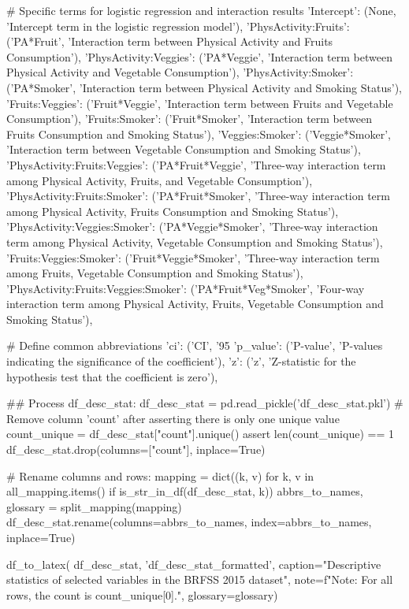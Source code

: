 \documentclass[11pt]{article}
\begin{document}
\begin{python}
{    # Specific terms for logistic regression and interaction results
    'Intercept': (None, 'Intercept term in the logistic regression model'),
    'PhysActivity:Fruits': ('PA*Fruit', 'Interaction term between Physical Activity and Fruits Consumption'),
    'PhysActivity:Veggies': ('PA*Veggie', 'Interaction term between Physical Activity and Vegetable Consumption'),
    'PhysActivity:Smoker': ('PA*Smoker', 'Interaction term between Physical Activity and Smoking Status'),
    'Fruits:Veggies': ('Fruit*Veggie', 'Interaction term between Fruits and Vegetable Consumption'),
    'Fruits:Smoker': ('Fruit*Smoker', 'Interaction term between Fruits Consumption and Smoking Status'),
    'Veggies:Smoker': ('Veggie*Smoker', 'Interaction term between Vegetable Consumption and Smoking Status'),
    'PhysActivity:Fruits:Veggies': ('PA*Fruit*Veggie', 'Three-way interaction term among Physical Activity, Fruits, and Vegetable Consumption'),
    'PhysActivity:Fruits:Smoker': ('PA*Fruit*Smoker', 'Three-way interaction term among Physical Activity, Fruits Consumption and Smoking Status'),
    'PhysActivity:Veggies:Smoker': ('PA*Veggie*Smoker', 'Three-way interaction term among Physical Activity, Vegetable Consumption and Smoking Status'),
    'Fruits:Veggies:Smoker': ('Fruit*Veggie*Smoker', 'Three-way interaction term among Fruits, Vegetable Consumption and Smoking Status'),
    'PhysActivity:Fruits:Veggies:Smoker': ('PA*Fruit*Veg*Smoker', 'Four-way interaction term among Physical Activity, Fruits, Vegetable Consumption and Smoking Status'),

    # Define common abbreviations
    'ci': ('CI', '95%
    'p_value': ('P-value', 'P-values indicating the significance of the coefficient'),
    'z': ('z', 'Z-statistic for the hypothesis test that the coefficient is zero'),
}

## Process df_desc_stat:
df_desc_stat = pd.read_pickle('df_desc_stat.pkl')
# Remove column 'count' after asserting there is only one unique value
count_unique = df_desc_stat["count"].unique()
assert len(count_unique) == 1
df_desc_stat.drop(columns=["count"], inplace=True)

# Rename columns and rows:
mapping = dict((k, v) for k, v in all_mapping.items() if is_str_in_df(df_desc_stat, k))
abbrs_to_names, glossary = split_mapping(mapping)
df_desc_stat.rename(columns=abbrs_to_names, index=abbrs_to_names, inplace=True)

df_to_latex(
    df_desc_stat, 'df_desc_stat_formatted',
    caption="Descriptive statistics of selected variables in the BRFSS 2015 dataset",
    note=f"Note: For all rows, the count is {count_unique[0]}.",
    glossary=glossary)


\end{python}
\end{document}
